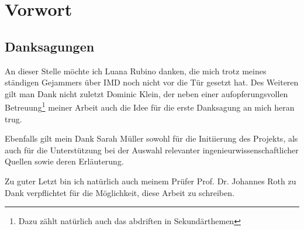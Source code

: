 \chapter{Vorwort}



\section*{Danksagungen}
An dieser Stelle möchte ich Luana Rubino danken, die mich trotz meines ständigen Gejammers über
IMD noch nicht vor die Tür gesetzt hat. Des Weiteren gilt man Dank nicht zuletzt Dominic Klein,
der neben einer aufopferungsvollen Betreuung\footnote{Dazu zählt natürlich auch das abdriften in
Sekundärthemen} meiner Arbeit auch die Idee für die erste Danksagung an mich heran trug.

Ebenfalls gilt mein Dank Sarah Müller sowohl für die Initiierung des Projekts, als auch für
die Unterstützung bei der Auswahl relevanter ingenieurwissenschaftlicher Quellen sowie deren
Erläuterung.

Zu guter Letzt bin ich natürlich auch meinem Prüfer Prof. Dr. Johannes Roth zu Dank verpflichtet
für die Möglichkeit, diese Arbeit zu schreiben.
